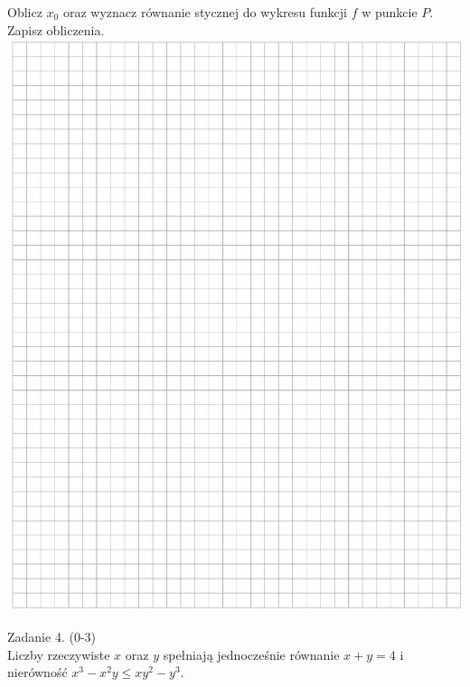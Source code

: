 \documentclass[10pt]{article}
\begin{document}
Oblicz \(x_{0}\) oraz wyznacz równanie stycznej do wykresu funkcji \(f\) w punkcie \(P\). Zapisz obliczenia.\\
\includegraphics[max width=\textwidth, center]{2024_11_21_f1ecc00f5c4ab21f0d04g-06}

Zadanie 4. (0-3)\\
Liczby rzeczywiste \(x\) oraz \(y\) spełniają jednocześnie równanie \(x+y=4\) i nierówność \(x^{3}-x^{2} y \leq x y^{2}-y^{3}\).
\end{document}
